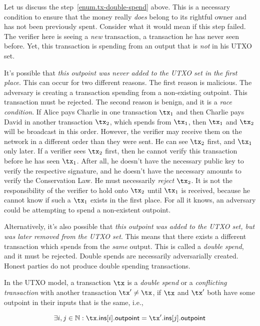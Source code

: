 Let us discuss the step~\ref{enum.tx-double-spend} above.
This is a necessary condition to ensure that the money really \emph{does} belong to its rightful owner and
has not been previously spent.
Consider what it would mean if this step failed.
The verifier here is seeing a \emph{new} transaction, a transaction he has never seen before.
Yet, this transaction is spending from an output that is \emph{not} in his UTXO set.

It's possible that \emph{this outpoint was never added to the UTXO set in the first place}.
This can occur for two different reasons.
The first reason is malicious. The adversary is creating a transaction spending from
a non-existing outpoint. This transaction must be rejected.
The second reason is benign, and it is a \emph{race condition}.
If Alice pays Charlie in one transaction $\tx_1$ and then Charlie pays David in another
transaction $\tx_2$, which spends from $\tx_1$, then $\tx_1$ and $\tx_2$ will be broadcast
in this order. However, the verifier may receive them on the network
in a different order than they were sent. He can see $\tx_2$ first, and $\tx_1$ only later.
If a verifier sees $\tx_2$ first, then
he cannot verify this transaction before he has seen $\tx_1$. After all, he doesn't have
the necessary public key to verify the respective signature, and he doesn't have the
necessary amounts to verify the Conservation Law.
He must necessarily \emph{reject}
$\tx_2$. It is not
the responsibility of the verifier to hold onto $\tx_2$ until $\tx_1$ is received,
because he cannot know if such a $\tx_1$ exists in the first place. For all it knows,
an adversary could be attempting to spend a non-existent outpoint.

Alternatively, it's also possible that \emph{this outpoint was added to the UTXO set, but was later
removed from the UTXO set}. This means that there exists a different transaction
which spends from the \emph{same} output. This is called a \emph{double spend},
and it must be rejected. Double spends are necessarily adversarially created.
Honest parties do not produce double spending transactions.

\begin{definition}
  In the UTXO model, a transaction $\tx$ is a \emph{double spend} or a
  \emph{conflicting transaction} with another transaction $\tx' \neq \tx$,
  if $\tx$ and $\tx'$ both have some outpoint in their inputs that is the
  same, i.e.,

  \[
    \exists i, j \in \mathbb{N}: \tx\textsf{.ins}[i]\textsf{.outpoint} = \tx'\textsf{.ins}[j]\textsf{.outpoint}
  \]
\end{definition}

